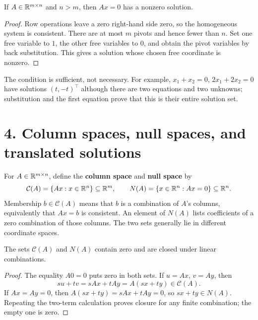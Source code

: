 \begin{proposition}\label{prop:01:excess}
If \(A\in\mathbb R^{m\times n}\) and \(n>m\), then \(Ax=0\) has a nonzero solution.
\end{proposition}
\begin{proof}
Row operations leave a zero right-hand side zero, so the homogeneous
system is consistent. There are at most \(m\) pivots and hence fewer
than \(n\). Set one free variable to \(1\), the other free variables
to \(0\), and obtain the pivot variables by back substitution.
This gives a solution whose chosen free coordinate is nonzero.
\end{proof}
The condition is sufficient, not necessary. For example,
\(x_1+x_2=0\), \(2x_1+2x_2=0\) have solutions \((t,-t)^\top\)
although there are two equations and two unknowns; substitution and the
first equation prove that this is their entire solution set.

\section*{4. Column spaces, null spaces, and translated solutions}

For \(A\in\mathbb R^{m\times n}\), define the \textbf{column space} and
\textbf{null space} by
\[
\mathcal C(A)=\{Ax:x\in\mathbb R^n\}\subseteq\mathbb R^m,\qquad
N(A)=\{x\in\mathbb R^n:Ax=0\}\subseteq\mathbb R^n.
\]
Membership \(b\in\mathcal C(A)\) means that \(b\) is a combination of
\(A\)'s columns, equivalently that \(Ax=b\) is consistent.
An element of \(N(A)\) lists coefficients of a zero combination of those
columns. The two sets generally lie in different coordinate spaces.

\begin{proposition}\label{prop:01:closure}
The sets \(\mathcal C(A)\) and \(N(A)\) contain zero and are closed under
linear combinations.
\end{proposition}
\begin{proof}
The equality \(A0=0\) puts zero in both sets. If \(u=Ax\), \(v=Ay\), then
\[
su+tv=sAx+tAy=A(sx+ty)\in\mathcal C(A).
\]
If \(Ax=Ay=0\), then \(A(sx+ty)=sAx+tAy=0\), so
\(sx+ty\in N(A)\). Repeating the two-term calculation proves closure
for any finite combination; the empty one is zero.
\end{proof}

